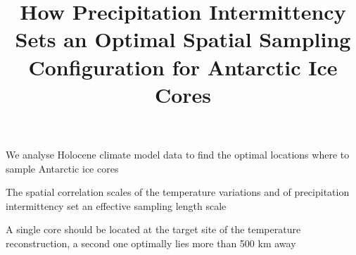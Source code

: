 \documentclass[draft]{agujournal2019}
\begin{document}
\title{How Precipitation Intermittency Sets an Optimal Spatial Sampling
  Configuration for Antarctic Ice Cores}




\begin{keypoints}
\item We analyse Holocene climate model data to find the optimal locations where
  to sample Antarctic ice cores
\item The spatial correlation scales of the temperature variations and of
  precipitation intermittency set an effective sampling length scale
\item A single core should be located at the target site of the temperature
  reconstruction, a second one optimally lies more than 500 km away
\end{keypoints}
\end{document}
